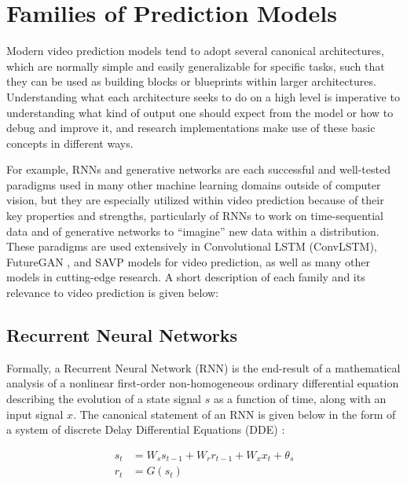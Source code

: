 \documentclass{scrartcl}
\begin{document}
\newpage
\section{Families of Prediction Models}
\label{sec:families}

Modern video prediction models tend to adopt several canonical architectures,
which are normally simple and easily generalizable for specific tasks, such
that they can be used as building blocks or blueprints within larger
architectures. Understanding what each architecture seeks to do on a high level
is imperative to understanding what kind of output one should expect from the
model or how to debug and improve it, and research implementations make use
of these basic concepts in different ways.

For example, RNNs and generative networks are each successful and well-tested
paradigms used in many other machine learning domains outside of computer
vision, but they are especially utilized within video prediction because of
their key properties and strengths, particularly of RNNs to work on
time-sequential data and of generative networks to ``imagine'' new data within
a distribution. These paradigms are used extensively in Convolutional LSTM
(ConvLSTM), FutureGAN \cite{futuregan}, and SAVP models \cite{savp} for video
prediction, as well as many other models in cutting-edge research. A short
description of each family and its relevance to video prediction is given
below:

\subsection{Recurrent Neural Networks}
\label{subsec:rnn}

Formally, a Recurrent Neural Network (RNN) is the end-result of a mathematical
analysis of a nonlinear first-order non-homogeneous ordinary differential
equation describing the evolution of a state signal $s$ as a function of time,
along with an input signal $x$. The canonical statement of an RNN is given
below in the form of a system of discrete Delay Differential Equations (DDE)
\cite{rnn_and_lstm_fundamentals}:

\begin{equation}
	\begin{split}
		s_t & = W_s s_{t - 1} + W_r r_{t - 1} + W_x x_t + \theta_s \\
		r_t & = G ( s_t )
	\end{split}
	\label{eq:rnn_canonical}
\end{equation}
\end{document}
